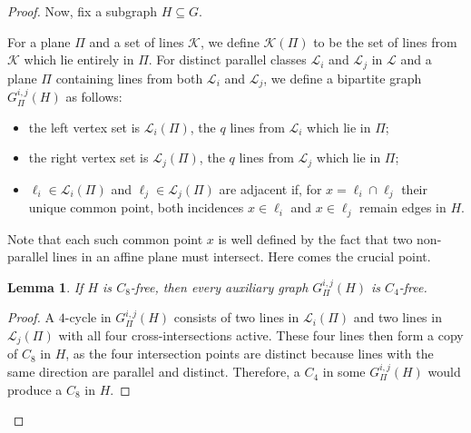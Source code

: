 \documentclass[A4paper,reqno,oneside,11pt]{amsart}
\theoremstyle{plain}
\newtheorem{lemma}[theorem]{Lemma}
\theoremstyle{definition}
\newcommand{\scK}{\mathscr{K}}
\newcommand{\scL}{\mathscr{L}}
\newcommand{\F}{\mathbb{F}}
\def\l{\ell}
\begin{document}
\begin{proof}
    Now, fix a subgraph $H \subseteq G$. 

    For a plane $\Pi$ and a set of lines $\scK$, we define $\scK(\Pi)$ to be the set of lines from $\scK$ which lie entirely in $\Pi$. For distinct parallel classes $\scL_i$ and $\scL_j$ in $\scL$ and a plane $\Pi$ containing lines from both $\scL_i$ and $\scL_j$, we define a bipartite graph
    $G_\Pi^{i,j}(H)$ as follows:
    \begin{itemize}[leftmargin=1.75em]
        \item the left vertex set is $\scL_i(\Pi)$, the $q$ lines from $\scL_i$ which lie in $\Pi$;
        \item the right vertex set is $\scL_j(\Pi)$, the $q$ lines from $\scL_j$ which lie in $\Pi$;
        \item $\l_i \in \scL_i(\Pi)$ and $\l_j \in \scL_j(\Pi)$ are adjacent if, for $x = \l_i \cap \l_j$ their unique common point,
        both incidences $x \in \l_i$ and $x \in \l_j$ remain edges in $H$.
    \end{itemize}
    Note that each such common point $x$ is well defined by the fact that two non-parallel lines in an affine plane must intersect. 
    Here comes the crucial point.

    \begin{lemma}
    \label{lem: no-rectangles}
        If $H$ is $C_8$-free, then every auxiliary graph $G_\Pi^{i,j}(H)$ is $C_4$-free.
    \end{lemma}

    \begin{proof}
        A $4$-cycle in $G_\Pi^{i,j}(H)$ consists of two lines in $\scL_i(\Pi)$ and two lines in $\scL_j(\Pi)$ with all
        four cross-intersections active. 
        These four lines then form a copy of $C_8$ in $H$, as the four intersection points
        are distinct because lines with the same direction are parallel and distinct. 
        Therefore, a $C_4$ in some
        $G_\Pi^{i,j}(H)$ would produce a $C_8$ in $H$.
    \end{proof}


\end{proof}
\end{document}
